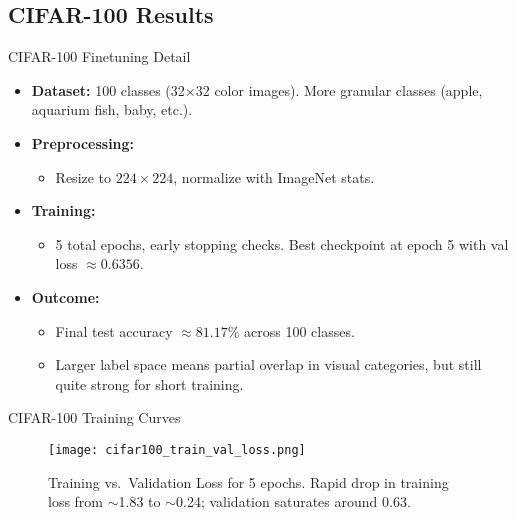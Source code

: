 \documentclass{beamer}
\begin{document}
\subsection{CIFAR-100 Results}
\begin{frame}{CIFAR-100 Finetuning Detail}
    \begin{itemize}
        \item \textbf{Dataset:} 100 classes (32$\times$32 color images). More granular classes (apple, aquarium fish, baby, etc.).
        \item \textbf{Preprocessing:}
              \begin{itemize}
                  \item Resize to $224\times 224$, normalize with ImageNet stats.
              \end{itemize}
        \item \textbf{Training:}
              \begin{itemize}
                  \item 5 total epochs, early stopping checks. Best checkpoint at epoch 5 with val loss $\approx 0.6356$.
              \end{itemize}
        \item \textbf{Outcome:}
              \begin{itemize}
                  \item Final test accuracy $\approx 81.17\%$ across 100 classes.
                  \item Larger label space means partial overlap in visual categories, but still quite strong for short training.
              \end{itemize}
    \end{itemize}
\end{frame}

\begin{frame}{CIFAR-100 Training Curves}
    \begin{figure}[h]
        \centering
        \texttt{[image: cifar100\_train\_val\_loss.png]}
        \caption{Training vs.\ Validation Loss for 5 epochs. Rapid drop in training loss from $\sim$1.83 to $\sim$0.24; validation saturates around 0.63.}
    \end{figure}
\end{frame}
\end{document}
